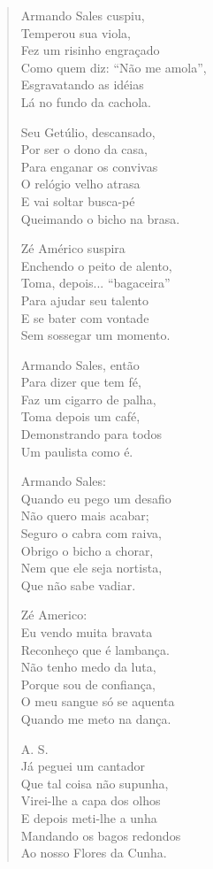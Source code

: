 \begin{verse}
Armando Sales cuspiu,\\
Temperou sua viola,\\
Fez um risinho engraçado\\
Como quem diz: “Não me amola”,\\
Esgravatando as idéias\\
Lá no fundo da cachola.


Seu Getúlio, descansado,\\
Por ser o dono da casa,\\
Para enganar os convivas\\
O relógio velho atrasa\\
E vai soltar busca-pé\\
Queimando o bicho na brasa.

Zé Américo suspira\\
Enchendo o peito de alento,\\
Toma, depois... “bagaceira”\\
Para ajudar seu talento\\
E se bater com vontade \\
Sem sossegar um momento.

Armando Sales, então\\
Para dizer que tem fé,\\
Faz um cigarro de palha,\\
Toma depois um café,\\
Demonstrando para todos\\
Um paulista como é.

Armando Sales:\\
Quando eu pego um desafio\\
Não quero mais acabar;\\
Seguro o cabra com raiva,\\
Obrigo o bicho a chorar,\\
Nem que ele seja nortista,\\
Que não sabe vadiar.


Zé Americo: \\
Eu vendo muita bravata\\
Reconheço que é lambança.\\
Não tenho medo da luta,\\
Porque sou de confiança,\\
O meu sangue só se aquenta\\
Quando me meto na dança.

A. S.\\
Já peguei um cantador\\
Que tal coisa não supunha,\\
Virei-lhe a capa dos olhos\\
E depois meti-lhe a unha\\
Mandando os bagos redondos\\
Ao nosso Flores da Cunha.


\end{verse}
